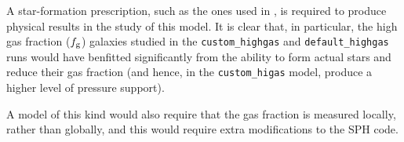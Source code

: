 A star-formation prescription, such as the ones used in \citet{many}, is required to produce physical results in the study of this model.
It is clear that, in particular, the high gas fraction ($f_\mathrm{g}$) galaxies studied in the {\tt custom\_highgas} and {\tt default\_highgas} runs would have benfitted significantly from the ability to form actual stars and reduce their gas fraction (and hence, in the {\tt custom\_higas} model, produce a higher level of pressure support).

A model of this kind would also require that the gas fraction is measured locally, rather than globally, and this would require extra modifications to the SPH code.
